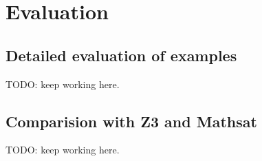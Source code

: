 \section{Evaluation}

\subsection{Detailed evaluation of examples}
TODO: keep working here.

\subsection{Comparision with Z3 and Mathsat}
TODO: keep working here.

